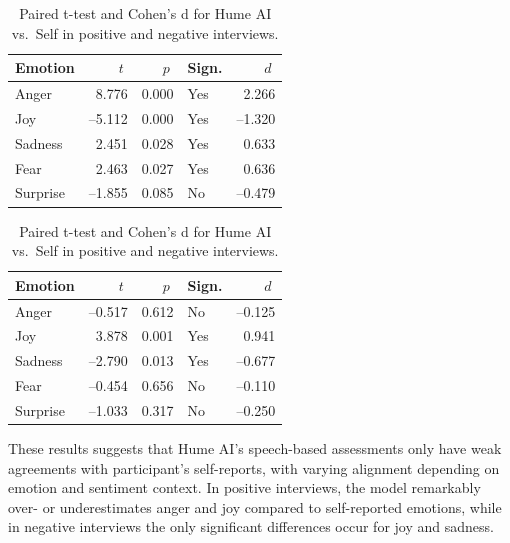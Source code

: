   \begin{table}[H]
    \centering
    \begin{subtable}{0.45\textwidth}
      \centering
      \caption{Positive Recordings}\label{tab:rq3_t_hume_self_pos}
      \begin{tabular}{l r r l r}
        \toprule
        \textbf{Emotion} & \(\;t\;\) & \(\;p\;\) & \textbf{Sign.} & \(\;d\;\) \\
        \midrule
        Anger    &  8.776 & 0.000 & Yes &  2.266 \\
        Joy      & –5.112 & 0.000 & Yes & –1.320 \\
        Sadness  &  2.451 & 0.028 & Yes &  0.633 \\
        Fear     &  2.463 & 0.027 & Yes &  0.636 \\
        Surprise & –1.855 & 0.085 & No  & –0.479 \\
        \bottomrule
      \end{tabular}
    \end{subtable}\hfill
    \begin{subtable}{0.45\textwidth}
      \centering
      \caption{Negative Recordings}\label{tab:rq3_t_hume_self_neg}
      \begin{tabular}{l r r l r}
        \toprule
        \textbf{Emotion} & \(\;t\;\) & \(\;p\;\) & \textbf{Sign.} & \(\;d\;\) \\
        \midrule
        Anger    & –0.517 & 0.612 & No  & –0.125 \\
        Joy      &  3.878 & 0.001 & Yes &  0.941 \\
        Sadness  & –2.790 & 0.013 & Yes & –0.677 \\
        Fear     & –0.454 & 0.656 & No  & –0.110 \\
        Surprise & –1.033 & 0.317 & No  & –0.250 \\
        \bottomrule
      \end{tabular}
    \end{subtable}
  
    \caption{Paired t-test and Cohen’s d for Hume AI vs.\ Self in positive and negative interviews.}
    \label{tab:rq3_t_hume_self_side_by_side}
  \end{table}
  
These results suggests that Hume AI's speech-based assessments only have weak agreements with participant's self-reports, with varying alignment depending on emotion and sentiment context. 
In positive interviews, the model remarkably over- or underestimates anger and joy compared to self-reported emotions, while in negative interviews the only significant differences occur for joy and sadness. 

